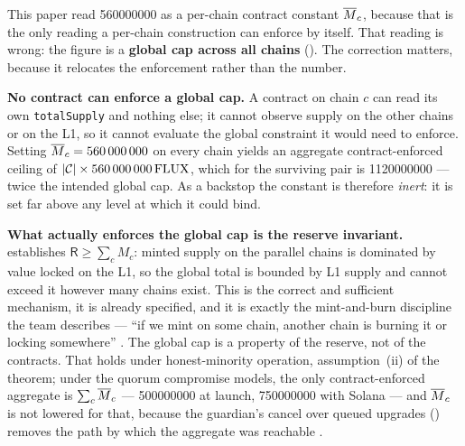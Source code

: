 \begin{remark}
\label{rem:global-cap}
This paper read \num{560000000}\flux{} as a per-chain contract constant $\overline{M}_{c}$, because that is
the only reading a per-chain construction can enforce by itself. That reading is wrong: the figure is
a \textbf{global cap across all chains}  (\planned).
The correction matters, because it relocates the enforcement rather than the number.

\textbf{No contract can enforce a global cap.} A contract on chain $c$ can read its own
\texttt{totalSupply} and nothing else; it cannot observe supply on the other chains or on the L1, so
it cannot evaluate the global constraint it would need to enforce. Setting $\overline{M}_{c} =
\num{560000000}$ on every chain yields an aggregate contract-enforced ceiling of $|\mathcal{C}|
\times \num{560000000}\,\mathrm{FLUX}$, which for the surviving pair is \num{1120000000}\flux{} --- twice
the intended global cap. As a backstop the constant is therefore \emph{inert}: it is set far above
any level at which it could bind.

\textbf{What actually enforces the global cap is the reserve invariant.}
 establishes $\mathsf{R} \ge \sum_c M_c$: minted supply on the parallel
chains is dominated by value locked on the L1, so the global total is bounded by L1 supply and cannot
exceed it however many chains exist. This is the correct and sufficient mechanism, it is already
specified, and it is exactly the mint-and-burn discipline the team describes --- ``if we mint on some
chain, another chain is burning it or locking somewhere''
. The global cap is a property of the reserve, not of the
contracts. That holds under honest-minority operation, assumption~(ii) of the theorem; under the
quorum compromise  models, the only contract-enforced aggregate is
$\sum_c \overline{M}_{c}$ --- \num{500000000}\flux{} at launch, \num{750000000}\flux{} with Solana --- and
$\overline{M}_{c}$ is not lowered for that, because the guardian's cancel over queued upgrades
() removes the path by which the aggregate was reachable
.


\end{remark}
